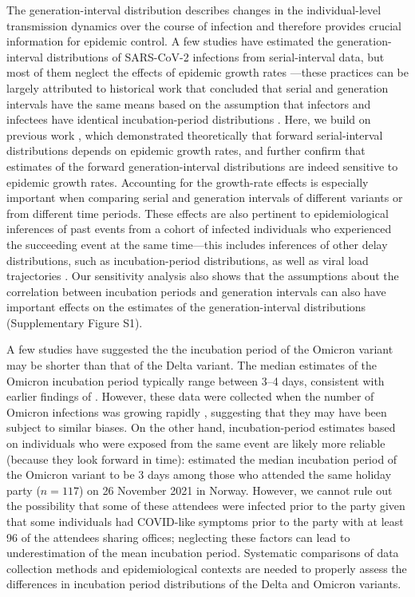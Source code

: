 \documentclass[12pt]{article}
\begin{document}
The generation-interval distribution describes changes in the individual-level transmission dynamics over the course of infection and therefore provides crucial information for epidemic control.
A few studies have estimated the generation-interval distributions of SARS-CoV-2 infections from serial-interval data, but most of them neglect the effects of epidemic growth rates \citep{ganyani2020estimating,he2020temporal,zhao2021estimating,hart2022generation}---these practices can be largely attributed to historical work that concluded that serial and generation intervals have the same means based on the assumption that infectors and infectees have identical incubation-period distributions \citep{svensson2007note,britton2019estimation,lehtinen2021relationship}.
Here, we build on previous work \citep{park2021forward}, which demonstrated theoretically that forward serial-interval distributions depends on epidemic growth rates, and further confirm that estimates of the forward generation-interval distributions are indeed sensitive to epidemic growth rates.
Accounting for the growth-rate effects is especially important when comparing serial and generation intervals of different variants or from different time periods.
These effects are also pertinent to epidemiological inferences of past events from a cohort of infected individuals who experienced the succeeding event at the same time---this includes inferences of other delay distributions, such as incubation-period distributions, as well as viral load trajectories \citep{hay2021estimating}.
Our sensitivity analysis also shows that the assumptions about the correlation between incubation periods and generation intervals can also have important effects on the estimates of the generation-interval distributions (Supplementary Figure S1).

A few studies have suggested the the incubation period of the Omicron variant may be shorter than that of the Delta variant.
The median estimates of the Omicron incubation period typically range between 3--4 days, consistent with earlier findings of \citep{backer2021omicron}. 
However, these data were collected when the number of Omicron infections was growing rapidly \citep{jansen2021investigation,song2022serial}, suggesting that they may have been subject to similar biases.
On the other hand, incubation-period estimates based on individuals who were exposed from the same event are likely more reliable (because they look forward in time):
\cite{brandal2021outbreak} estimated the median incubation period of the Omicron variant to be 3 days among those who attended the same holiday party ($n=117$) on 26 November 2021 in Norway. 
However, we cannot rule out the possibility that some of these attendees were infected prior to the party given that some individuals had COVID-like symptoms prior to the party with at least 96 of the attendees sharing offices; neglecting these factors can lead to underestimation of the mean incubation period.
Systematic comparisons of data collection methods and epidemiological contexts are needed to properly assess the differences in incubation period distributions of the Delta and Omicron variants.
\end{document}
